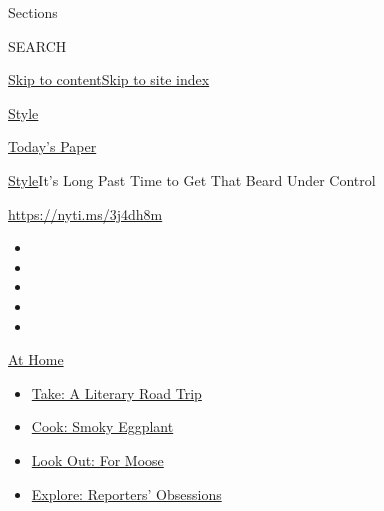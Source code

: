 Sections

SEARCH

\protect\hyperlink{site-content}{Skip to
content}\protect\hyperlink{site-index}{Skip to site index}

\href{https://www.nytimes3xbfgragh.onion/section/style}{Style}

\href{https://myaccount.nytimes3xbfgragh.onion/auth/login?response_type=cookie\&client_id=vi}{}

\href{https://www.nytimes3xbfgragh.onion/section/todayspaper}{Today's
Paper}

\href{/section/style}{Style}\textbar{}It's Long Past Time to Get That
Beard Under Control

\url{https://nyti.ms/3j4dh8m}

\begin{itemize}
\item
\item
\item
\item
\item
\end{itemize}

\href{https://www.nytimes3xbfgragh.onion/spotlight/at-home?action=click\&pgtype=Article\&state=default\&region=TOP_BANNER\&context=at_home_menu}{At
Home}

\begin{itemize}
\tightlist
\item
  \href{https://www.nytimes3xbfgragh.onion/2020/07/28/books/time-for-a-literary-road-trip.html?action=click\&pgtype=Article\&state=default\&region=TOP_BANNER\&context=at_home_menu}{Take:
  A Literary Road Trip}
\item
  \href{https://www.nytimes3xbfgragh.onion/2020/07/29/magazine/bored-with-your-home-cooking-some-smoky-eggplant-will-fix-that.html?action=click\&pgtype=Article\&state=default\&region=TOP_BANNER\&context=at_home_menu}{Cook:
  Smoky Eggplant}
\item
  \href{https://www.nytimes3xbfgragh.onion/2020/07/27/travel/moose-michigan-isle-royale.html?action=click\&pgtype=Article\&state=default\&region=TOP_BANNER\&context=at_home_menu}{Look
  Out: For Moose}
\item
  \href{https://www.nytimes3xbfgragh.onion/interactive/2020/at-home/even-more-reporters-editors-diaries-lists-recommendations.html?action=click\&pgtype=Article\&state=default\&region=TOP_BANNER\&context=at_home_menu}{Explore:
  Reporters' Obsessions}
\end{itemize}

